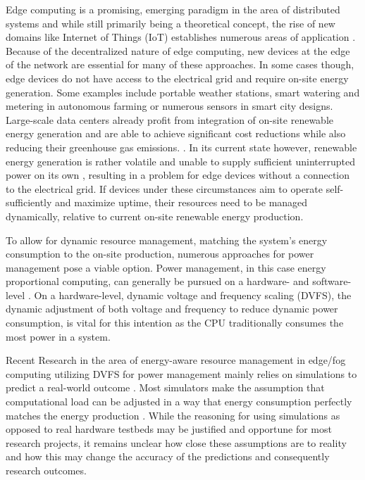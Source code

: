 Edge computing is a promising, emerging paradigm in the area of distributed
systems and while still primarily being a theoretical concept, the rise of new
domains like Internet of Things (IoT) establishes numerous areas of application
\cite{premsankar2018}. Because of the decentralized nature of edge computing,
new devices at the edge of the network are essential for many of these
approaches. In some cases though, edge devices do not have access to the
electrical grid and require on-site energy generation. Some examples include
portable weather stations, smart watering and metering in autonomous farming or
numerous sensors in smart city designs. Large-scale data centers already profit
from integration of on-site renewable energy generation and are able to achieve
significant cost reductions while also reducing their greenhouse gas emissions.
\cite{tu2013}. In its current state however, renewable energy generation is
rather volatile and unable to supply sufficient uninterrupted power on its own
\cite{rostirolla2022}, resulting in a problem for edge devices without a
connection to the electrical grid. If devices under these circumstances aim to
operate self-sufficiently and maximize uptime, their resources need to be
managed dynamically, relative to current on-site renewable energy production.

To allow for dynamic resource management, matching the system's energy
consumption to the on-site production, numerous approaches for power management
pose a viable option. Power management, in this case energy proportional
computing, can generally be pursued on a hardware- and software-level
\cite{barroso2007}. On a hardware-level, dynamic voltage and frequency scaling
(DVFS), the dynamic adjustment of both voltage and frequency to reduce dynamic
power consumption, is vital for this intention as the \textsc{CPU} traditionally
consumes the most power in a system.

Recent Research in the area of energy-aware resource management in edge/fog
computing utilizing DVFS for power management mainly relies on simulations to
predict a real-world outcome \cite{wiesner2022, karimiafshar2020, toor2019}.
Most simulators make the assumption that computational load can be adjusted in a
way that energy consumption perfectly matches the energy production \cite{leaf,
cloudsim, ifogsim, chameleon}. While the reasoning for using simulations as
opposed to real hardware testbeds may be justified and opportune for most
research projects, it remains unclear how close these assumptions are to reality
and how this may change the accuracy of the predictions and consequently
research outcomes.

